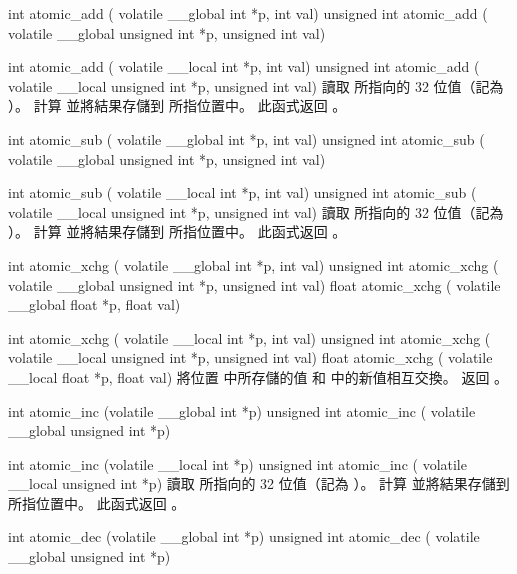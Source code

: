int atomic_add (
	volatile __global int *p,
	int val) 
unsigned int atomic_add ( 
	volatile __global unsigned int *p, 
	unsigned int val)

int atomic_add (
	volatile __local int *p,
	int val)
unsigned int atomic_add (
	volatile __local unsigned int *p,
	unsigned int val)
\stopbuffer
{}
讀取  所指向的 32 位值（記為 ）。
計算  並將結果存儲到  所指位置中。
此函式返回 。
\stopbuffer

int atomic_sub (
	volatile __global int *p,
	int val) 
unsigned int atomic_sub ( 
	volatile __global unsigned int *p, 
	unsigned int val)

int atomic_sub (
	volatile __local int *p,
	int val)
unsigned int atomic_sub (
	volatile __local unsigned int *p,
	unsigned int val)
\stopbuffer
{}
讀取  所指向的 32 位值（記為 ）。
計算  並將結果存儲到  所指位置中。
此函式返回 。
\stopbuffer

int atomic_xchg (
	volatile __global int *p,
	int val)
unsigned int atomic_xchg (
	volatile __global unsigned int *p,
	unsigned int val)
float atomic_xchg (
	volatile __global float *p,
	float val)

int atomic_xchg (
	volatile __local int *p,
	int val)
unsigned int atomic_xchg (
	volatile __local unsigned int *p,
	unsigned int val)
float atomic_xchg (
	volatile __local float *p,
	float val)
\stopbuffer
{}
將位置  中所存儲的值  和  中的新值相互交換。
返回 。
\stopbuffer

int atomic_inc (volatile __global int *p)
unsigned int atomic_inc (
	volatile __global unsigned int *p)

int atomic_inc (volatile __local int *p)
unsigned int atomic_inc (
	volatile __local unsigned int *p)
\stopbuffer
{}
讀取  所指向的 32 位值（記為 ）。
計算  並將結果存儲到  所指位置中。
此函式返回 。
\stopbuffer

int atomic_dec (volatile __global int *p)
unsigned int atomic_dec (
	volatile __global unsigned int *p)

